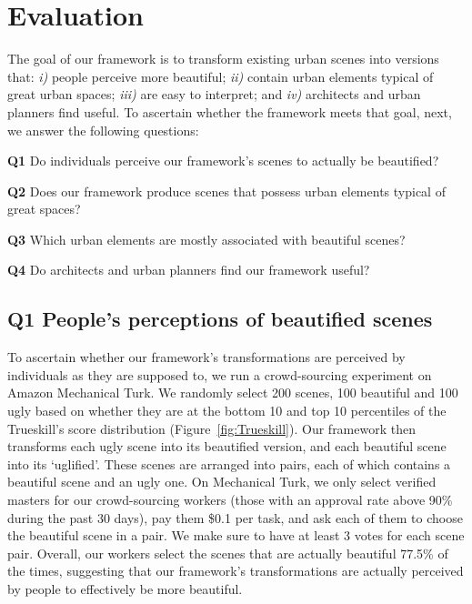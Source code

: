 \section{Evaluation}
\label{sec:evaluation}

The goal of our framework is to transform existing urban scenes into versions that: \emph{i)} people perceive more beautiful; \emph{ii)} contain urban elements typical of great urban spaces; \emph{iii)} are easy to interpret; and \emph{iv)} architects and urban planners find useful. To ascertain whether the framework meets that goal, next, we answer the following questions: 

\begin{description}
\item{\textbf{Q1}} Do individuals perceive our framework's scenes to actually be beautified?

\item{\textbf{Q2}}  Does our framework produce scenes that possess urban elements typical of great spaces?

\item{\textbf{Q3}}  Which urban elements are mostly associated with beautiful scenes?

\item{\textbf{Q4}}  Do architects and urban planners find our framework useful?

\end{description}


\subsection*{Q1 People's perceptions of beautified scenes}
To ascertain whether our framework's transformations are perceived by individuals as they are supposed to, we run a crowd-sourcing experiment on Amazon Mechanical Turk.  We randomly select 200 scenes, 100 beautiful and 100 ugly  based on whether they are at the bottom 10 and top 10 percentiles of the Trueskill's score distribution (Figure~\ref{fig:Trueskill}). Our framework then transforms each ugly scene into its beautified version, and each beautiful scene into its `uglified'. These scenes are arranged into pairs, each of which contains a beautiful scene and an ugly one. On  Mechanical Turk, we only select verified masters for our crowd-sourcing workers (those with an approval rate above 90\% during the past 30 days), pay them \$0.1 per  task,  and ask each of them to choose the beautiful scene in a pair.  We make sure to have at least 3 votes for each scene pair. Overall, our workers select the scenes that are actually beautiful 77.5\% of the times, suggesting that our framework's transformations are actually perceived by people to effectively be more beautiful. 


